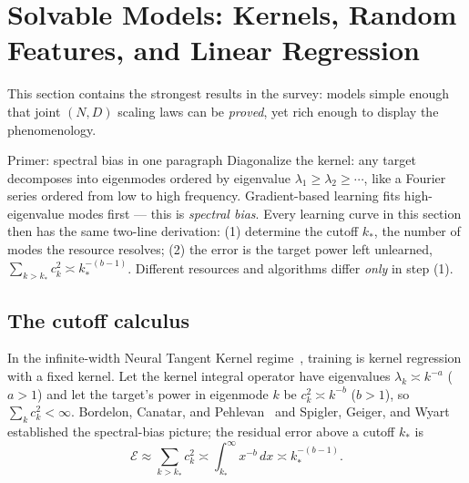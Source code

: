 \documentclass[11pt,a4paper]{article}
\theoremstyle{definition}
\begin{document}
\section{Solvable Models: Kernels, Random Features, and Linear Regression}
\label{sec:statistical_physics}

This section contains the strongest results in the survey: models simple enough that joint $(N,D)$ scaling laws can be \emph{proved}, yet rich enough to display the phenomenology.

\begin{intuition}{Primer: spectral bias in one paragraph}
Diagonalize the kernel: any target decomposes into eigenmodes ordered by eigenvalue $\lambda_1\ge\lambda_2\ge\cdots$, like a Fourier series ordered from low to high frequency. Gradient-based learning fits high-eigenvalue modes first --- this is \emph{spectral bias}. Every learning curve in this section then has the same two-line derivation: (1) determine the cutoff $k_*$, the number of modes the resource resolves; (2) the error is the target power left unlearned, $\sum_{k>k_*}c_k^2 \asymp k_*^{-(b-1)}$. Different resources and algorithms differ \emph{only} in step (1).
\end{intuition}

\subsection{The cutoff calculus}
\label{subsec:kernel_spectra}

In the infinite-width Neural Tangent Kernel regime~\cite{jacot2018neural,chizat2019lazy}, training is kernel regression with a fixed kernel. Let the kernel integral operator have eigenvalues $\lambda_k\asymp k^{-a}$ ($a>1$) and let the target's power in eigenmode $k$ be $c_k^2\asymp k^{-b}$ ($b>1$), so $\sum_k c_k^2<\infty$. Bordelon, Canatar, and Pehlevan~\cite{bordelon2020spectrum,canatar2021spectral} and Spigler, Geiger, and Wyart~\cite{spigler2020asymptotic} established the spectral-bias picture; the residual error above a cutoff $k_*$ is
\begin{equation}
  \mathcal{E} \approx \sum_{k>k_*}c_k^2 \asymp \int_{k_*}^{\infty} x^{-b}\,dx \asymp k_*^{-(b-1)} .
  \label{eq:hard-cutoff}
\end{equation}
\end{document}
